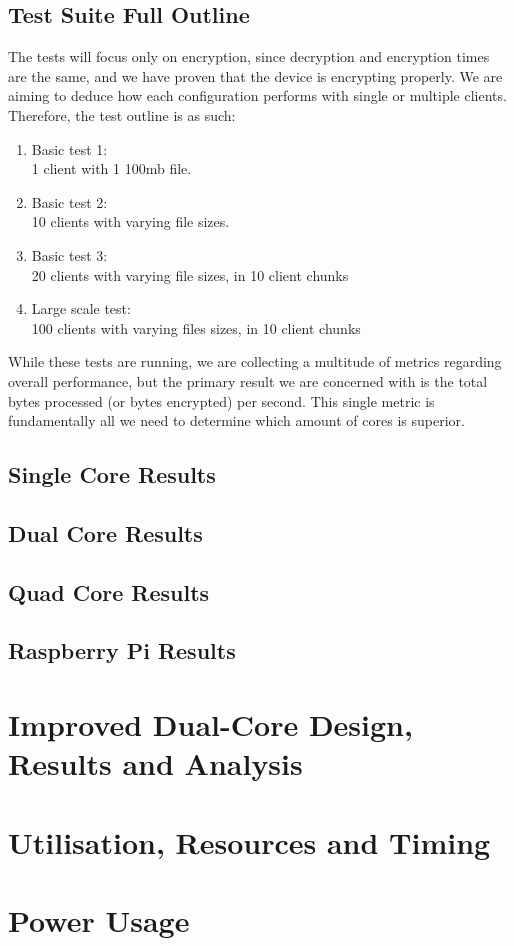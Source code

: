 \subsection{Test Suite Full Outline}
The tests will focus only on encryption, since decryption and encryption times are the same, and we have proven that the device is encrypting properly. We are aiming to deduce how each configuration performs with single or multiple clients. Therefore, the test outline is as such:
\begin{enumerate}
    \item Basic test 1: \\
    1 client with 1 100mb file.
    \item Basic test 2: \\
    10 clients with varying file sizes.
    \item Basic test 3: \\
    20 clients with varying file sizes, in 10 client chunks
    \item Large scale test: \\
    100 clients with varying files sizes, in 10 client chunks
\end{enumerate}


While these tests are running, we are collecting a multitude of metrics regarding overall performance, but the primary result we are concerned with is the total bytes processed (or bytes encrypted) per second. This single metric is fundamentally all we need to determine which amount of cores is superior.
\subsection{Single Core Results}



\subsection{Dual Core Results}
\subsection{Quad Core Results}
\subsection{Raspberry Pi Results}
\section{Improved Dual-Core Design, Results and Analysis}
\section{Utilisation, Resources and Timing}
\section{Power Usage}